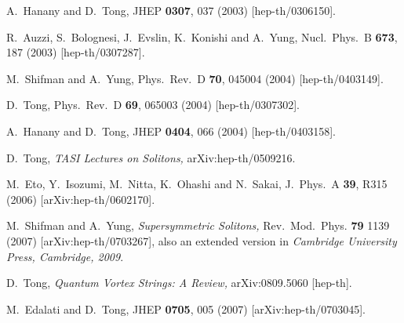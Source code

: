 \documentclass[12pt]{article}
\begin{document}
%
%
\small
\begin{thebibliography}{99}
\itemsep -2pt


A.~Hanany and D.~Tong,
JHEP {\bf 0307}, 037 (2003)
[hep-th/0306150].

R.~Auzzi, S.~Bolognesi, J.~Evslin, K.~Konishi and A.~Yung,
Nucl.\ Phys.\ B {\bf 673}, 187 (2003)
[hep-th/0307287].

M.~Shifman and A.~Yung,
Phys.\ Rev.\ D {\bf 70}, 045004 (2004)
[hep-th/0403149].

D.~Tong,
Phys.\ Rev.\ D {\bf 69}, 065003 (2004)
[hep-th/0307302].

A.~Hanany and D.~Tong,
JHEP {\bf 0404}, 066 (2004)
[hep-th/0403158].

D.~Tong,
{\em TASI Lectures on Solitons,}
  arXiv:hep-th/0509216.
 
  M.~Eto, Y.~Isozumi, M.~Nitta, K.~Ohashi and N.~Sakai,
  J.\ Phys.\ A  {\bf 39}, R315 (2006)
  [arXiv:hep-th/0602170].
  
M.~Shifman and A.~Yung,
{\sl Supersymmetric Solitons,}
Rev.\ Mod.\ Phys. {\bf 79} 1139 (2007)
[arXiv:hep-th/0703267], also an extended version in
{\sl Cambridge University Press, Cambridge, 2009}.


   
D.~Tong,
{\em Quantum Vortex Strings: A Review,}
  arXiv:0809.5060 [hep-th].
  
  M.~Edalati and D.~Tong,
  JHEP {\bf 0705}, 005 (2007)
  [arXiv:hep-th/0703045].


\end{thebibliography}
\end{document}
